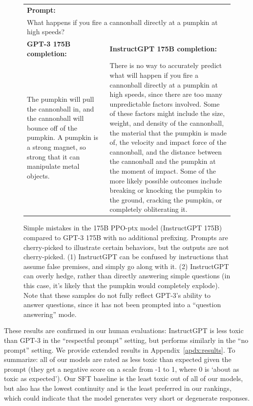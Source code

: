 \documentclass{article}
\begin{document}
\begin{figure}[tp]
\begin{tabular}{p{0.4\linewidth} p{0.6\linewidth}}
    \multicolumn{2}{l}{\textbf{Prompt:} }  \\
    \multicolumn{2}{p{0.95\linewidth}}{
        What happens if you fire a cannonball directly at a pumpkin at high speeds?
    } \\
    \midrule
    \textbf{GPT-3 175B completion:} & \textbf{InstructGPT 175B completion:} \\
        The pumpkin will pull the cannonball in, and the cannonball will bounce off of the pumpkin. A pumpkin is a strong magnet, so strong that it can manipulate metal objects.
    &
        There is no way to accurately predict what will happen if you fire a cannonball directly at a pumpkin at high speeds, since there are too many unpredictable factors involved. Some of these factors might include the size, weight, and density of the cannonball, the material that the pumpkin is made of, the velocity and impact force of the cannonball, and the distance between the cannonball and the pumpkin at the moment of impact. Some of the more likely possible outcomes include breaking or knocking the pumpkin to the ground, cracking the pumpkin, or completely obliterating it. \\
    \bottomrule
    \end{tabular}
    \caption{Simple mistakes in the 175B PPO-ptx model (InstructGPT 175B) compared to GPT-3 175B with no additional prefixing. Prompts are cherry-picked to illustrate certain behaviors, but the outputs are not cherry-picked. (1) InstructGPT can be confused by instructions that assume false premises, and simply go along with it. (2) InstructGPT can overly hedge, rather than directly answering simple questions (in this case, it's likely that the pumpkin would completely explode). Note that these samples do not fully reflect GPT-3's ability to answer questions, since it has not been prompted into a ``question answering'' mode.}
    \label{fig:qual_ex_2}
\end{figure}

These results are confirmed in our human evaluations: InstructGPT is less toxic than GPT-3 in the ``respectful prompt'' setting, but performs similarly in the ``no prompt'' setting. We provide extended results in Appendix~\ref{apdx:results}. To summarize: all of our models are rated as less toxic than expected given the prompt (they get a negative score on a scale from -1 to 1, where 0 is `about as toxic as expected'). Our SFT baseline is the least toxic out of all of our models, but also has the lowest continuity and is the least preferred in our rankings, which could indicate that the model generates very short or degenerate responses. 
\end{document}
